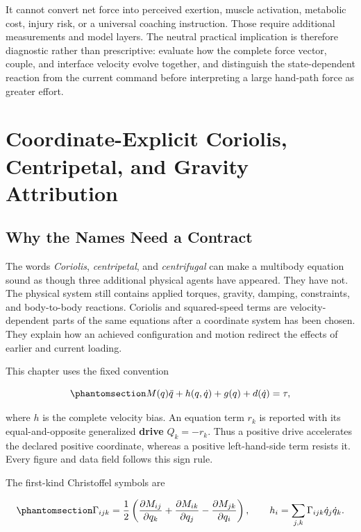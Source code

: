 \documentclass[
  letterpaper,
]{report}
\begin{document}
It cannot convert net force into perceived exertion, muscle activation,
metabolic cost, injury risk, or a universal coaching instruction. Those
require additional measurements and model layers. The neutral practical
implication is therefore diagnostic rather than prescriptive: evaluate
how the complete force vector, couple, and interface velocity evolve
together, and distinguish the state-dependent reaction from the current
command before interpreting a large hand-path force as greater effort.

\chapter{Coordinate-Explicit Coriolis, Centripetal, and Gravity
Attribution}\label{sec-coordinate-force-sources}

\section{Why the Names Need a Contract}\label{sec-force-source-contract}

The words \emph{Coriolis}, \emph{centripetal}, and \emph{centrifugal}
can make a multibody equation sound as though three additional physical
agents have appeared. They have not. The physical system still contains
applied torques, gravity, damping, constraints, and body-to-body
reactions. Coriolis and squared-speed terms are velocity-dependent parts
of the same equations after a coordinate system has been chosen. They
explain how an achieved configuration and motion redirect the effects of
earlier and current loading.

This chapter uses the fixed convention

\begin{equation}\phantomsection\label{eq-source-equation}{
M(q)\ddot q+h(q,\dot q)+g(q)+d(\dot q)=\tau,
}\end{equation}

where \(h\) is the complete velocity bias. An equation term \(r_k\) is
reported with its equal-and-opposite generalized \textbf{drive}
\(Q_k=-r_k\). Thus a positive drive accelerates the declared positive
coordinate, whereas a positive left-hand-side term resists it. Every
figure and data field follows this sign rule.

The first-kind Christoffel symbols are

\begin{equation}\phantomsection\label{eq-source-christoffel}{
\Gamma_{ijk}
=\frac{1}{2}\left(
\frac{\partial M_{ij}}{\partial q_k}
+\frac{\partial M_{ik}}{\partial q_j}
-\frac{\partial M_{jk}}{\partial q_i}
\right),
\qquad
h_i=\sum_{j,k}\Gamma_{ijk}\dot q_j\dot q_k.
}\end{equation}
\end{document}
